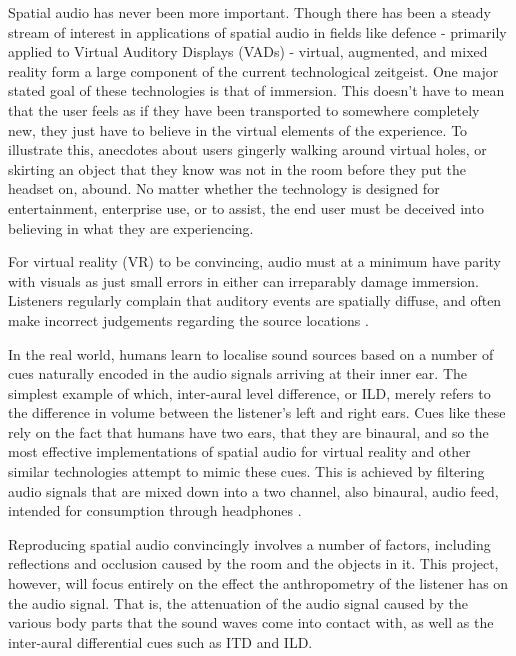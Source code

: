 Spatial audio has never been more important. Though there has been a steady stream of interest in applications of spatial audio in fields like defence - primarily applied to Virtual Auditory Displays (VADs)\citep{bronkhorst} - virtual, augmented, and mixed reality form a large component of the current technological zeitgeist. One major stated goal of these technologies is that of immersion. This doesn't have to mean that the user feels as if they have been transported to somewhere completely new, they just have to believe in the virtual elements of the experience. To illustrate this, anecdotes about users gingerly walking around virtual holes, or skirting an object that they know was not in the room before they put the headset on, abound. No matter whether the technology is designed for entertainment, enterprise use, or to assist, the end user must be deceived into believing in what they are experiencing. 

For virtual reality (VR) to be convincing, audio must at a minimum have parity with visuals as just small errors in either can irreparably damage immersion. Listeners regularly complain that auditory events are spatially diffuse, and often make incorrect judgements regarding the source locations \citep{wenzel1}.

In the real world, humans learn to localise sound sources based on a number of cues naturally encoded in the audio signals arriving at their inner ear. The simplest example of which, inter-aural level difference, or ILD, merely refers to the difference in volume between the listener's left and right ears. Cues like these rely on the fact that humans have two ears, that they are binaural, and so the most effective implementations of spatial audio for virtual reality and other similar technologies attempt to mimic these cues. This is achieved by filtering audio signals that are mixed down into a two channel, also binaural, audio feed, intended for consumption through headphones \citep{Algazi2011}.

Reproducing spatial audio convincingly involves a number of factors, including reflections and occlusion caused by the room and the objects in it. This project, however, will focus entirely on the effect the anthropometry of the listener has on the audio signal. That is, the attenuation of the audio signal caused by the various body parts that the sound waves come into contact with, as well as the inter-aural differential cues such as ITD and ILD.


